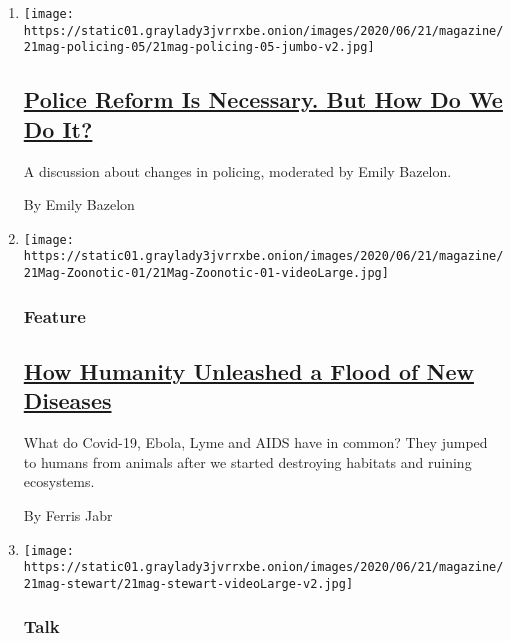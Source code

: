 \begin{enumerate}
\def\labelenumi{\arabic{enumi}.}
\item
  \texttt{[image: https://static01.graylady3jvrrxbe.onion/images/2020/06/21/magazine/21mag-policing-05/21mag-policing-05-jumbo-v2.jpg]}

  \hypertarget{police-reform-is-necessary-but-how-do-we-do-it}{%
  \subsection{\texorpdfstring{\href{/interactive/2020/06/13/magazine/police-reform.html}{Police
  Reform Is Necessary. But How Do We Do
  It?}}{Police Reform Is Necessary. But How Do We Do It?}}\label{police-reform-is-necessary-but-how-do-we-do-it}}

  A discussion about changes in policing, moderated by Emily Bazelon.

  By Emily Bazelon
\item
  \texttt{[image: https://static01.graylady3jvrrxbe.onion/images/2020/06/21/magazine/21Mag-Zoonotic-01/21Mag-Zoonotic-01-videoLarge.jpg]}

  \hypertarget{feature}{%
  \subsubsection{Feature}\label{feature}}

  \hypertarget{how-humanity-unleashed-a-flood-of-new-diseases}{%
  \subsection{\texorpdfstring{\href{/2020/06/17/magazine/animal-disease-covid.html}{How
  Humanity Unleashed a Flood of New
  Diseases}}{How Humanity Unleashed a Flood of New Diseases}}\label{how-humanity-unleashed-a-flood-of-new-diseases}}

  What do Covid-19, Ebola, Lyme and AIDS have in common? They jumped to
  humans from animals after we started destroying habitats and ruining
  ecosystems.

  By Ferris Jabr
\item
  \texttt{[image: https://static01.graylady3jvrrxbe.onion/images/2020/06/21/magazine/21mag-stewart/21mag-stewart-videoLarge-v2.jpg]}

  \hypertarget{talk}{%
  \subsubsection{Talk}\label{talk}}


\end{enumerate}
